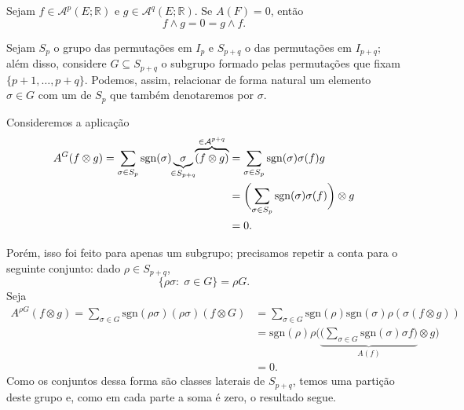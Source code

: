 \documentclass[../differential_forms.tex]{subfiles}
\begin{document}
\begin{lemma*}
	Sejam \(f\in \mathcal{A}^{p}(E; \mathbb{R})\) e \(g\in \mathcal{A}^{q}(E; \mathbb{R})\). Se \(A(F) = 0 \), então
	\[
		f \wedge g = 0 = g \wedge f.
	\]
\end{lemma*}
\begin{proof*}
	Sejam \(S_{p}\) o grupo das permutações em \(I_{p}\) e \(S_{p+q}\) o das permutações em \(I_{p+q}\); além disso, considere \(G\subseteq S_{p+q}\) o subgrupo formado
	pelas permutações que fixam \(\{p+1, \dotsc , p+q\}\). Podemos, assim, relacionar de forma natural um elemento \(\sigma \in G\) com um de \(S_{p}\) que também denotaremos
	por \(\sigma\).

	Consideremos a aplicação
	\begin{align*}
		A^{G}(f \otimes g) = \sum\limits_{\sigma \in S_{p}}^{}\mathrm{sgn}(\sigma) \underbrace{\sigma}_{\mathclap{\in S_{p+q}}} \overbrace{(f\otimes g)}^{\in \mathcal{A}^{p+q}} & = \sum\limits_{\sigma \in S_{p}}^{}\mathrm{sgn}(\sigma) \sigma (f)g                       \\
		                                                                                                                                                                         & = \biggl(\sum\limits_{\sigma \in S_{p}}^{}\mathrm{sgn}(\sigma) \sigma (f)\biggr)\otimes g \\
		                                                                                                                                                                         & = 0.
	\end{align*}

	Porém, isso foi feito para apenas um subgrupo; precisamos repetir a conta para o seguinte conjunto: dado \(\rho \in S_{p+q}\),
	\[
		\{\rho \sigma :\; \sigma \in G\} = \rho G.
	\]
	Seja
	\begin{align*}
		A^{\rho G}(f\otimes g) = \sum\limits_{\sigma \in G}^{}\mathrm{sgn}(\rho \sigma )(\rho \sigma )(f\otimes G) & = \sum\limits_{\sigma \in G}^{}\mathrm{sgn}(\rho) \mathrm{sgn}(\sigma )\rho (\sigma (f\otimes g))                                          \\
		                                                                                                           & = \mathrm{sgn}(\rho )\rho \biggl(\underbrace{\bigl(\sum\limits_{\sigma \in G}^{}\mathrm{sgn}(\sigma)\sigma f\bigr)}_{A(f)}\otimes g\biggr) \\
		                                                                                                           & = 0.
	\end{align*}
	Como os conjuntos dessa forma são classes laterais de \(S_{p+q}\), temos uma partição deste grupo e, como em cada parte a soma é zero, o resultado segue. \qedsymbol
\end{proof*}
\end{document}
